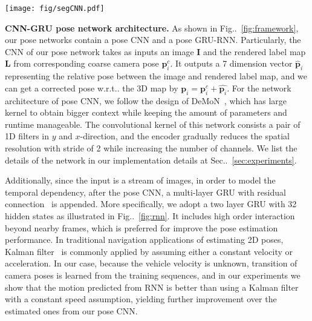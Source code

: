 \documentclass[10pt,twocolumn,letterpaper]{article}
\makeatletter
\newcommand{\figref}[1]{Fig\onedot~\ref{#1}}
\newcommand{\secref}[1]{Sec\onedot~\ref{#1}}
\newcommand{\ve}[1]{{\mathbf #1}} %
\DeclareRobustCommand\onedot{\futurelet\@let@token\@onedot}
\def\onedot{\ifx\@let@token.\else.\null\fi\xspace}
\def\wrt{w.r.t\onedot}
\makeatother
\begin{document}
\begin{figure*}[t]
\center
\vspace{-0.6\baselineskip}
\texttt{[image: fig/segCNN.pdf]}
\caption{Architecture of the segment CNN with rendered label map as a segmentation priori. At bottom of each convolutional block, we show the filter size, and at top we mark the downsample rates of each block \wrt the input image size. The 'softmax' text box indicates the places a loss is calculated. Details are in \secref{subsec:parsing}.}
\label{fig:segnet}
\vspace{-1.35\baselineskip}
\end{figure*}\textbf{CNN-GRU pose network architecture.}
As shown in \figref{fig:framework}, our pose networks contain a pose CNN and a pose GRU-RNN. Particularly,
the CNN of our pose network takes as inputs an image $\ve{I}$ and the rendered label map $\ve{L}$ from corresponding coarse camera pose $\ve{p}_i^c$. It outputs a 7 dimension vector $\hat{\ve{p}}_i$ representing the relative pose between the image and rendered label map, and we can get a corrected pose \wrt the 3D map by $\ve{p}_i = \ve{p}_i^c + \hat{\ve{p}_i}$.
For the network architecture of pose CNN, we follow the design of DeMoN~\cite{ummenhofer2016demon}, which has large kernel to obtain bigger context while keeping the amount of parameters and runtime manageable. The convolutional kernel of this network consists a pair of 1D filters in $y$ and $x$-direction, and the encoder gradually reduces the spatial resolution with stride of 2 while increasing the number of channels. We list the details of the network in our implementation details at \secref{sec:experiments}.

Additionally, since the input is a stream of images, in order to model the temporal dependency,
after the pose CNN, a multi-layer GRU with residual connection~\cite{wu2016google} is appended.
More specifically, we adopt a two layer GRU with 32 hidden states as illustrated in \figref{fig:rnn}. It includes high order interaction beyond nearby frames, which is preferred for improve the pose estimation performance.
In traditional navigation applications of estimating 2D poses,  Kalman filter~\cite{kalman1960new} is commonly applied by assuming either a constant velocity or acceleration.
In our case, because the vehicle velocity is unknown, transition of camera poses is learned from the training sequences, and in our experiments we show that the motion predicted from RNN is better than using a Kalman filter with a constant speed assumption, yielding further improvement over the estimated ones from our pose CNN.
\end{document}
